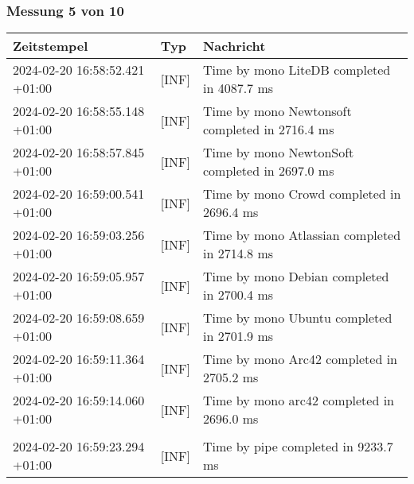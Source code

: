     \subsubsection*{Messung 5 von 10} \label{subsubsec:LiteDbWenigerPaketeAlsDb5von10}
        {
            {\small
                \begin{tabularx}{\textwidth}{|l|l|X|}
                    \hline
                    \textbf{Zeitstempel} & \textbf{Typ} & \textbf{Nachricht} \\
                    \hline
                    \endhead
                    2024-02-20 16:58:52.421 +01:00 & [INF] & Time by mono LiteDB completed in 4087.7 ms \\
                    2024-02-20 16:58:55.148 +01:00 & [INF] & Time by mono Newtonsoft completed in 2716.4 ms \\
                    2024-02-20 16:58:57.845 +01:00 & [INF] & Time by mono NewtonSoft completed in 2697.0 ms \\
                    2024-02-20 16:59:00.541 +01:00 & [INF] & Time by mono Crowd completed in 2696.4 ms \\
                    2024-02-20 16:59:03.256 +01:00 & [INF] & Time by mono Atlassian completed in 2714.8 ms \\
                    2024-02-20 16:59:05.957 +01:00 & [INF] & Time by mono Debian completed in 2700.4 ms \\
                    2024-02-20 16:59:08.659 +01:00 & [INF] & Time by mono Ubuntu completed in 2701.9 ms \\
                    2024-02-20 16:59:11.364 +01:00 & [INF] & Time by mono Arc42 completed in 2705.2 ms \\
                    2024-02-20 16:59:14.060 +01:00 & [INF] & Time by mono arc42 completed in 2696.0 ms \\
                    & & \\
                    2024-02-20 16:59:23.294 +01:00 & [INF] & Time by pipe completed in 9233.7 ms \\
                    \hline
                \end{tabularx}
            }
        }

